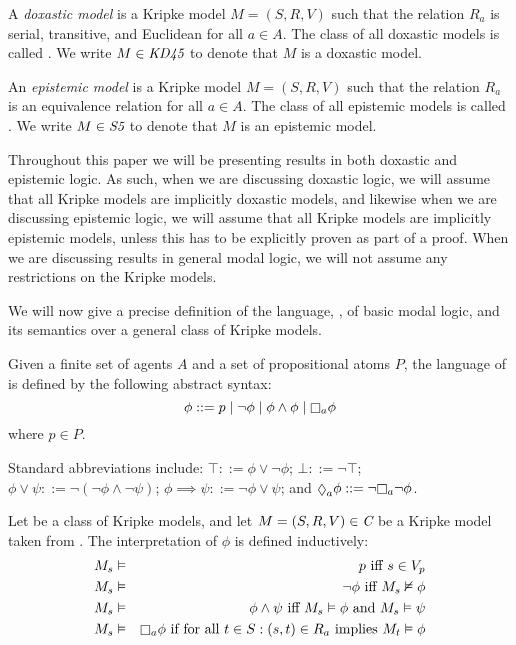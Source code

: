 \begin{definition}
A \textit{doxastic model} is a Kripke model $M = (S, R, V)$ such that the
relation $R_a$ is serial, transitive, and Euclidean for all $a \in A$. The class
of all doxastic models is called \classKD{}. We write $M \in \textit{KD45}{}$ to
denote that $M$ is a doxastic model.
\end{definition}

\begin{definition}
An \textit{epistemic model} is a Kripke model $M = (S, R, V)$ such that the
relation $R_a$ is an equivalence relation for all $a \in A$. The class of all
epistemic models is called \classS{}. We write $M \in \textit{S5}{}$ to denote that
$M$ is an epistemic model.
\end{definition}

Throughout this paper we will be presenting results in both doxastic and
epistemic logic.  As such, when we are discussing doxastic logic, we will
assume that all Kripke models are implicitly doxastic models, and likewise when
we are discussing epistemic logic, we will assume that all Kripke models are
implicitly epistemic models, unless this has to be explicitly proven as part of
a proof. When we are discussing results in general modal logic, we will not
assume any restrictions on the Kripke models.

We will now give a precise definition of the language, \lang{}, of basic modal
logic, and its semantics over a general class of Kripke models.

\begin{definition}
Given a finite set of agents $A$ and a set of propositional atoms $P$, the
language of \langF{} is defined by the following abstract syntax:
$$
\phi ::=    p \bnfalt
            \neg \phi \bnfalt
            \phi \land \phi \bnfalt
            \knows_a \phi
$$
where $p \in P$.
\end{definition}

Standard abbreviations include:
$\top ::= \phi \lor \neg \phi$;
$\bot ::= \neg \top$;
$\phi \lor \psi ::= \neg (\neg \phi \land \neg \psi)$;
$\phi \implies \psi ::= \neg \phi \lor \psi$;
and $\suspects_a \phi ::= \neg \knows_a \neg \phi$.

\begin{definition}
Let \classC{} be a class of Kripke models, and let $M = (S, R, V) \in \textit{C}$
be a Kripke model taken from \classC{}. The interpretation of $\phi$ is defined
inductively:
\begin{eqnarray*}
M_s &\entails& p \text{ iff } s \in V_p\\
M_s &\entails& \neg \phi \text{ iff } M_s \nentails \phi\\
M_s &\entails& \phi \land \psi \text{ iff } M_s \entails \phi \text{ and } M_s
\entails \psi\\
M_s &\entails& \knows_a \phi \text{ if for all } t \in S : (s, t) \in R_a \text{
implies } M_t \entails \phi
\end{eqnarray*}
\end{definition}

